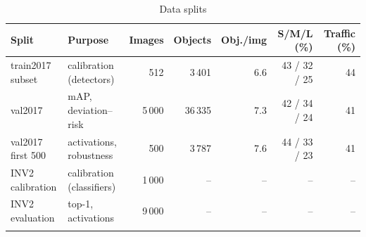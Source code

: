 \begin{table}[htbp]
\footnotesize\setlength{\tabcolsep}{4pt}
\caption{Data splits}\label{tab:datasets}
\begin{tabular}{@{}llrrrrr@{}}
\toprule
Split & Purpose & Images & Objects & Obj./img & S/M/L (\%) & Traffic (\%) \\
\midrule
train2017 subset & calibration (detectors) & 512 & 3\,401 & 6.6 & 43 / 32 / 25 & 44 \\
val2017 & mAP, deviation--risk & 5\,000 & 36\,335 & 7.3 & 42 / 34 / 24 & 41 \\
val2017 first 500 & activations, robustness & 500 & 3\,787 & 7.6 & 44 / 33 / 23 & 41 \\
INV2 calibration & calibration (classifiers) & 1\,000 & -- & -- & -- & -- \\
INV2 evaluation & top-1, activations & 9\,000 & -- & -- & -- & -- \\
\botrule
\end{tabular}
\end{table}
